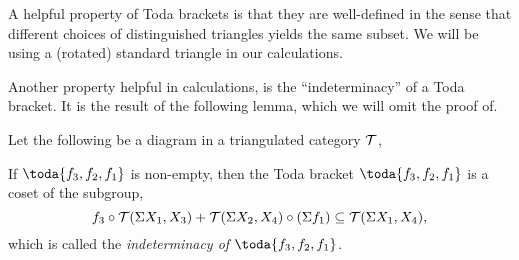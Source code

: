 A helpful property of Toda brackets is that they are well-defined in the sense that different choices of distinguished triangles yields the same subset. We will be using a (rotated) standard triangle in our calculations.

Another property helpful in calculations, is the ``indeterminacy'' of a Toda bracket. It is the result of the following lemma, which we will omit the proof of.
\begin{lemma}
    \label{lem:indeterminacy}
    Let the following be a diagram in a triangulated category \( {\mathcal{T}} \),
    \begin{center}
    \end{center}

    If \( \toda{f_3, f_2, f_1} \) is non-empty, then the Toda bracket \( \toda{f_3, f_2, f_1} \) is a coset of the subgroup,
    \[
        f_3 \circ {\mathcal{T}}(\Sigma X_1, X_3)  + {\mathcal{T}}(\Sigma X_2, X_4) \circ (\Sigma f_1) \subseteq {\mathcal{T}}(\Sigma X_1, X_4),
    \]
    which is called the \emph{indeterminacy of \( \toda{f_3, f_2, f_1} \)}.
\end{lemma}
